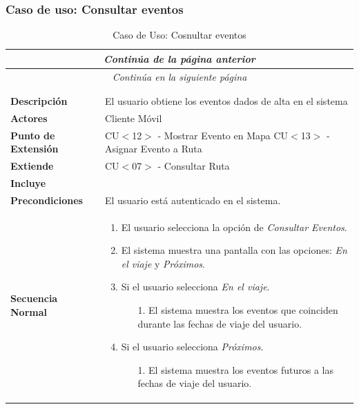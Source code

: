 \subsubsection*{Caso de uso: Consultar eventos}
\begin{longtable}{| p{4cm} | p{10cm} |}
\endfirsthead
\multicolumn{2}{c}{\textit{Continúa de la página anterior}}\\[12pt]
\hline
\endhead
\hline
\multicolumn{2}{c}{\textit{Continúa en la siguiente página}} \\
\endfoot
\hline
\caption{Caso de Uso: Cosnultar eventos}\label{fig:1}\\
\endlastfoot


\hline
\multicolumn{2}{|c|}{\textbf{CU$<$11$>$ - Consultar Eventos}} \\

\hline
\textbf{Descripción} &
El usuario obtiene los eventos dados de alta en el sistema\\

\hline
\textbf{Actores} &
Cliente Móvil\\

\hline
\textbf{Punto de Extensión} &
CU$<$12$>$ - Mostrar Evento en Mapa
CU$<$13$>$ - Asignar Evento a Ruta
\\

\hline
\textbf{Extiende} &
CU$<$07$>$ - Consultar Ruta
\\

\hline
\textbf{Incluye} &
\\

\hline
\textbf{Precondiciones} &
El usuario está autenticado en el sistema.\\

\hline
\textbf{Secuencia Normal} &\mbox{}\par\vspace{-\baselineskip}
\begin{enumerate}[leftmargin=0.7cm, topsep=0.1cm]
\item El usuario selecciona la opción de \textit{Consultar Eventos}.
\item El sistema muestra una pantalla con las opciones: \textit{En el viaje} y \textit{Próximos}.
\item Si el usuario selecciona \textit{En el viaje}.
	\begin{itemize}
	\item[1.] El sistema muestra los eventos que coinciden durante las fechas de viaje del usuario.
	\end{itemize}
\item Si el usuario selecciona \textit{Próximos}.
	\begin{itemize}
	\item[1.] El sistema muestra los eventos futuros a las fechas de viaje del usuario.
	\end{itemize}
\end{enumerate}\\


\end{longtable}
